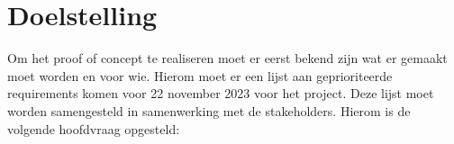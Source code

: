 \section{Doelstelling}
Om het proof of concept te realiseren moet er eerst bekend zijn wat er gemaakt moet worden en voor wie.
Hierom moet er een lijst aan geprioriteerde requirements komen voor 22 november 2023 voor het  project.
Deze lijst moet worden samengesteld in samenwerking met de stakeholders. Hierom is de volgende hoofdvraag opgesteld:

\whitespace
\begin{center}
    \textit{\MainQuestion}
\end{center}
